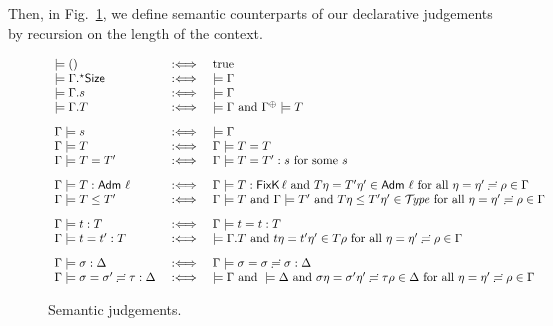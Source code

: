 \documentclass[acmsmall,screen]{acmart}\settopmatter{}
\begin{document}
\noindent
Then, in Fig.~\ref{fig:sem}, we define semantic counterparts of our declarative judgements by recursion on the length of the context.
\begin{figure}
\hrulefill
\[
\begin{array}{l@{\quad}l@{\quad}l}
  \models () & \defas & \mtrue \\
  \models \eext \Gamma \Size & \defas & \models \Gamma \\
  \models \cext \Gamma s     & \defas & \models \Gamma \\
  \models \cext \Gamma T     & \defas & \models \Gamma \mand \resurrect\Gamma \models T
\\[2ex]
  \Gamma \models s & \defas & \models \Gamma \\
  \Gamma \models T & \defas & \Gamma \models T = T \\
  \Gamma \models T = T' & \defas & \Gamma \models T = T' : s \mforsome s %
\\[2ex]
  \Gamma \models T : \Adm\,\ell & \defas & \Gamma \models T : \FixK\,\ell \mand
    T\eta = T'\eta' \in \Adm\,\ell
    \mforall \eta = \eta' \eeq \rho \in \Gamma
\\
  \Gamma \models T \leq T' & \defas & \Gamma \models T \mand \Gamma \models T' \mand
    T\eta \leq T'\eta' \in \TYPE
    \mforall \eta = \eta' \eeq \rho \in \Gamma
\\[2ex]
  \Gamma \models t : T & \defas & \Gamma \models t = t : T \\
  \Gamma \models t = t' : T & \defas & %
    \models \cext \Gamma T \mand
    t \eta = t' \eta' \in T \rho \mforall \eta = \eta' \eeq \rho \in \Gamma
\\[2ex]
  \Gamma \models \sigma : \Delta & \defas & \Gamma \models \sigma = \sigma \eeq \sigma : \Delta \\
  \Gamma \models \sigma = \sigma' \eeq \tau : \Delta & \defas &
    \models \Gamma \mand \models \Delta \mand
    \sigma \eta = \sigma' \eta' \eeq \tau \rho \in \Delta
    \mforall \eta = \eta' \eeq \rho \in \Gamma
\end{array}
\]
\hrulefill
\caption{Semantic judgements.\label{fig:sem}}
\end{figure}
\end{document}
